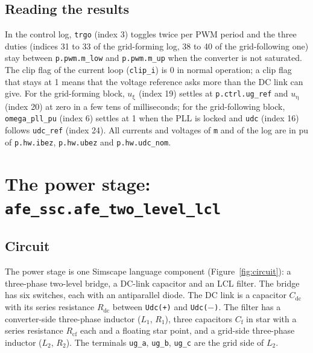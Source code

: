 \documentclass[11pt,a4paper]{scrartcl}
\newcommand{\ped}[1]{_{\mathrm{#1}}}
\newcommand{\code}[1]{\texttt{#1}}
\begin{document}
\begin{onehalfspace}
\subsection{Reading the results}
\label{sec:results}

In the control log, \code{trgo} (index 3) toggles twice per PWM period and the three duties (indices 31 to 33 of the grid-forming log, 38 to 40 of the grid-following one) stay between \code{p.pwm.m\_low} and \code{p.pwm.m\_up} when the converter is not saturated. The clip flag of the current loop (\code{clip\_i}) is 0 in normal operation; a clip flag that stays at 1 means that the voltage reference asks more than the DC link can give. For the grid-forming block, $u\ped{\xi}$ (index 19) settles at \code{p.ctrl.ug\_ref} and $u\ped{\eta}$ (index 20) at zero in a few tens of milliseconds; for the grid-following block, \code{omega\_pll\_pu} (index 6) settles at 1 when the PLL is locked and \code{udc} (index 16) follows \code{udc\_ref} (index 24). All currents and voltages of \code{m} and of the log are in pu of \code{p.hw.ibez}, \code{p.hw.ubez} and \code{p.hw.udc\_nom}.

\section{The power stage: \code{afe\_ssc.afe\_two\_level\_lcl}}
\label{sec:power_stage}

\subsection{Circuit}
\label{sec:circuit}

The power stage is one Simscape language component (Figure~\ref{fig:circuit}): a three-phase two-level bridge, a DC-link capacitor and an LCL filter. The bridge has six switches, each with an antiparallel diode. The DC link is a capacitor $C\ped{dc}$ with its series resistance $R\ped{dc}$ between \code{Udc(+)} and \code{Udc($-$)}. The filter has a converter-side three-phase inductor ($L\ped{1}$, $R\ped{1}$), three capacitors $C\ped{f}$ in star with a series resistance $R\ped{cf}$ each and a floating star point, and a grid-side three-phase inductor ($L\ped{2}$, $R\ped{2}$). The terminals \code{ug\_a}, \code{ug\_b}, \code{ug\_c} are the grid side of $L\ped{2}$.


\end{onehalfspace}
\end{document}
